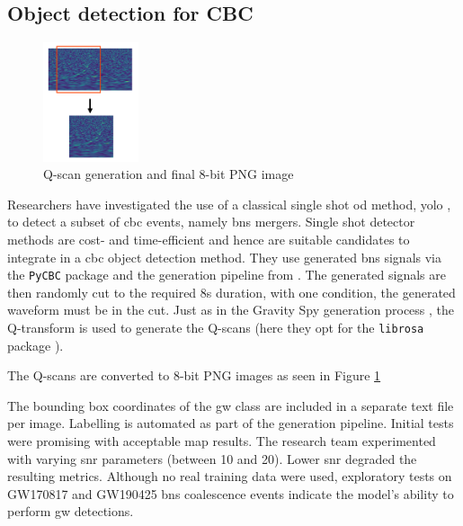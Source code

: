 \subsection{Object detection for CBC}
\begin{figure}
    \includegraphics[width=0.25\textwidth]{Images/od_bns.png}
    \caption{Q-scan generation and final 8-bit PNG image \citep{aveiro2022identification}}
    \label{fig:od_bns}
\end{figure}
Researchers \citep{aveiro2022identification} have investigated the use of a classical single shot \acrlong{od} method, \acrfull{yolo} \citep{redmon2016you}, to detect a subset of \acrshort{cbc} events, namely \acrshort{bns} mergers. Single shot detector methods are cost- and time-efficient \citep{redmon2017yolo9000} and hence are suitable candidates to integrate in a \acrshort{cbc} object detection method. 
They use generated \acrshort{bns} signals via the \verb|PyCBC| package \citep{nitz2020gwastro} and the generation pipeline from \citep{gebhard2019convolutional}. The generated signals are then randomly cut to the required 8s duration, with one condition, the generated waveform must be in the cut. 
Just as in the Gravity Spy generation process \citep{zevin2017gravity}, the Q-transform \citep{chatterji2004multiresolution} is used to generate the Q-scans (here they opt for the \verb|librosa| package \citep{mcfee2015librosa}). 

The Q-scans are converted to 8-bit PNG images as seen in Figure \ref{fig:od_bns}

The bounding box coordinates of the \acrshort{gw} class are included in a separate text file per image. Labelling is automated as part of the generation pipeline. Initial tests were promising with acceptable \acrfull{map} results. The research team experimented with varying \acrshort{snr} parameters (between 10 and 20). Lower \acrshort{snr} degraded the resulting metrics. Although no real training data were used, exploratory tests on GW170817 \citep{abbott2017gw170817} and GW190425 \citep{abbott2020gw190425} \acrshort{bns} coalescence events indicate the model's ability to perform \acrshort{gw} detections.



